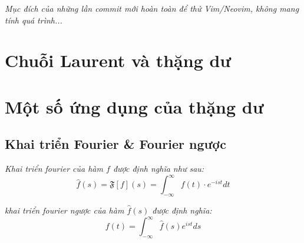 \documentclass[14pt]{extarticle}
\begin{document}
	\textit{Mục đích của những lần commit mới hoàn toàn để thử Vim/Neovim, không mang tính quá trình...}
	
	

	\section{Chuỗi Laurent và thặng dư}
	

	\section{Một số ứng dụng của thặng dư}
	
	

	\subsection{Khai triển Fourier \& Fourier ngược}
	\begin{definition}
		\textit{Khai triển fourier của hàm \(f\) được định nghĩa như sau:}
		\begin{equation}
			\hat{f}(s) = \mathfrak{F}[f](s)=\int_{-\infty}^\infty
				f(t)\cdot e^{-ist}dt
			\label{eq:fourier01}
		\end{equation}
	\end{definition}

	\begin{definition}
		\textit{khai triển fourier ngược của hàm $\hat{f}(s)$ được định nghĩa:}
		\begin{equation}
			f(t) = \int_{-\infty}^\infty \hat{f}(s) e^{ist}ds
			\label{eq:fourier02}
		\end{equation}
	\end{definition}
\end{document}
